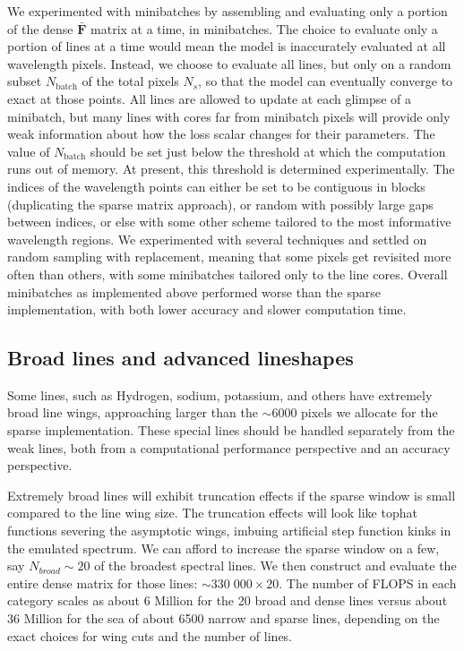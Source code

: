 \documentclass[modern]{aastex631}
\begin{document}
We experimented with minibatches by assembling and evaluating only a portion of the dense $\bar{\bm{F}}$ matrix at a time, in minibatches. The choice to evaluate only a portion of lines at a time would mean the model is inaccurately evaluated at all wavelength pixels. Instead, we choose to evaluate all lines, but only on a random subset $N_{\mathrm{batch}}$ of the total pixels $N_s$, so that the model can eventually converge to exact at those points. All lines are allowed to update at each glimpse of a minibatch, but many lines with cores far from minibatch pixels will provide only weak information about how the loss scalar changes for their parameters. The value of $N_{\mathrm{batch}}$ should be set just below the threshold at which the computation runs out of memory. At present, this threshold is determined experimentally. The indices of the wavelength points can either be set to be contiguous in blocks (duplicating the sparse matrix approach), or random with possibly large gaps between indices, or else with some other scheme tailored to the most informative wavelength regions. We experimented with several techniques and settled on random sampling with replacement, meaning that some pixels get revisited more often than others, with some minibatches tailored only to the line cores.  Overall minibatches as implemented above performed worse than the sparse implementation, with both lower accuracy and slower computation time.

\subsection{Broad lines and advanced lineshapes}

Some lines, such as Hydrogen, sodium, potassium, and others have extremely broad line wings, approaching larger than the $\sim6000$ pixels we allocate for the sparse implementation. These special lines should be handled separately from the weak lines, both from a computational performance perspective and an accuracy perspective.

Extremely broad lines will exhibit truncation effects if the sparse window is small compared to the line wing size. The truncation effects will look like tophat functions severing the asymptotic wings, imbuing artificial step function kinks in the emulated spectrum. We can afford to increase the sparse window on a few, say $N_{broad}\sim20$ of the broadest spectral lines. We then construct and evaluate the entire dense matrix for those lines: $\sim 330\;000 \times 20$. The number of FLOPS in each category scales as about 6 Million for the 20 broad and dense lines versus about 36 Million for the sea of about 6500 narrow and sparse lines, depending on the exact choices for wing cuts and the number of lines.
\end{document}
